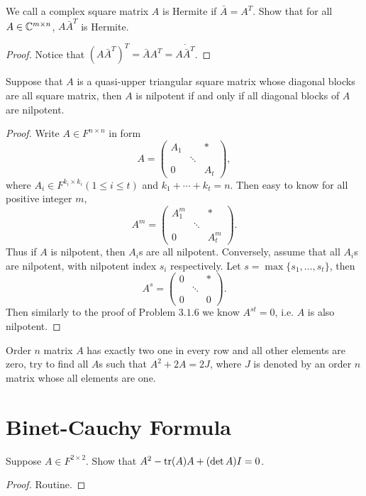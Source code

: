 \begin{pro}%
	We call a complex square matrix $A$ is Hermite if $\bar{A}=A^T$. Show that for all $A\in\mathbb{C}^{m\times n}$, $A\bar{A}^T$ is Hermite.
\end{pro}
\begin{proof}
	Notice that $(A\bar{A}^T)^T=\bar{A}A^T=\overline{A\bar{A}^T}$.
\end{proof}

\begin{pro}%
	Suppose that $A$ is a quasi-upper triangular square matrix whose diagonal blocks are all square matrix, then $A$ is nilpotent if and only if all diagonal blocks of $A$ are nilpotent.
\end{pro}
\begin{proof}
	Write $A\in F^{n\times n}$ in form
	\[A=\begin{pmatrix}A_1& &*\\ &\ddots& \\0& &A_t\end{pmatrix},\]
	where $A_i\in F^{k_i\times k_i}(1\leq i\leq t)$ and $k_1+\cdots+k_t=n$. Then easy to know for all positive integer $m$,
	\[A^m=\begin{pmatrix}A_1^m& &*\\ &\ddots& \\0& &A_t^m\end{pmatrix}.\]
	Thus if $A$ is nilpotent, then $A_i$s are all nilpotent. Conversely, assume that all $A_i$s are nilpotent, with nilpotent index $s_i$ respectively. Let $s=\max\{s_1,\ldots,s_t\}$, then 
	\[A^s=\begin{pmatrix}0& &*\\ &\ddots& \\0& &0\end{pmatrix}.\]
	Then similarly to the proof of Problem $3.1.6$ we know $A^{st}=0$, i.e. $A$ is also nilpotent.
\end{proof}

\begin{pro}%
	Order $n$ matrix $A$ has exactly two one in every row and all other elements are zero, try to find all $A$s such that $A^2+2A=2J$, where $J$ is denoted by an order $n$ matrix whose all elements are one.
\end{pro}

\section{Binet-Cauchy Formula}
\begin{pro}%
	Suppose $A\in F^{2\times 2}$. Show that $A^2-\operatorname*{tr}(A)A+(\det A)I=0$.
\end{pro}
\begin{proof}
	Routine.
\end{proof}

